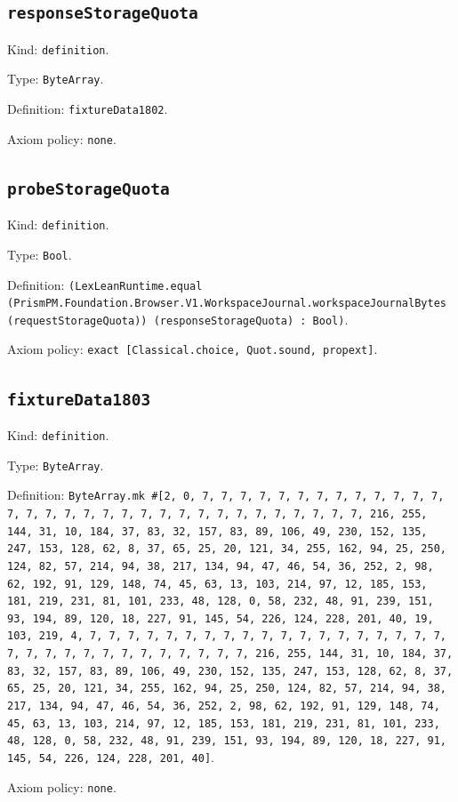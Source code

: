 \documentclass[11pt]{article}
\begin{document}
\subsection*{\texttt{responseStorageQuota}}
\noindent Kind: \texttt{definition}.\par
\noindent Type: \texttt{ByteArray}.\par
\noindent Definition: \texttt{fixtureData1802}.\par
\noindent Axiom policy: \texttt{none}.\par
\subsection*{\texttt{probeStorageQuota}}
\noindent Kind: \texttt{definition}.\par
\noindent Type: \texttt{Bool}.\par
\noindent Definition: \texttt{(LexLeanRuntime.equal (PrismPM.Foundation.Browser.V1.WorkspaceJournal.workspaceJournalBytes (requestStorageQuota)) (responseStorageQuota) : Bool)}.\par
\noindent Axiom policy: \texttt{exact [Classical.choice, Quot.sound, propext]}.\par
\subsection*{\texttt{fixtureData1803}}
\noindent Kind: \texttt{definition}.\par
\noindent Type: \texttt{ByteArray}.\par
\noindent Definition: \texttt{ByteArray.mk \#[2, 0, 7, 7, 7, 7, 7, 7, 7, 7, 7, 7, 7, 7, 7, 7, 7, 7, 7, 7, 7, 7, 7, 7, 7, 7, 7, 7, 7, 7, 7, 7, 7, 7, 216, 255, 144, 31, 10, 184, 37, 83, 32, 157, 83, 89, 106, 49, 230, 152, 135, 247, 153, 128, 62, 8, 37, 65, 25, 20, 121, 34, 255, 162, 94, 25, 250, 124, 82, 57, 214, 94, 38, 217, 134, 94, 47, 46, 54, 36, 252, 2, 98, 62, 192, 91, 129, 148, 74, 45, 63, 13, 103, 214, 97, 12, 185, 153, 181, 219, 231, 81, 101, 233, 48, 128, 0, 58, 232, 48, 91, 239, 151, 93, 194, 89, 120, 18, 227, 91, 145, 54, 226, 124, 228, 201, 40, 19, 103, 219, 4, 7, 7, 7, 7, 7, 7, 7, 7, 7, 7, 7, 7, 7, 7, 7, 7, 7, 7, 7, 7, 7, 7, 7, 7, 7, 7, 7, 7, 7, 7, 7, 7, 216, 255, 144, 31, 10, 184, 37, 83, 32, 157, 83, 89, 106, 49, 230, 152, 135, 247, 153, 128, 62, 8, 37, 65, 25, 20, 121, 34, 255, 162, 94, 25, 250, 124, 82, 57, 214, 94, 38, 217, 134, 94, 47, 46, 54, 36, 252, 2, 98, 62, 192, 91, 129, 148, 74, 45, 63, 13, 103, 214, 97, 12, 185, 153, 181, 219, 231, 81, 101, 233, 48, 128, 0, 58, 232, 48, 91, 239, 151, 93, 194, 89, 120, 18, 227, 91, 145, 54, 226, 124, 228, 201, 40]}.\par
\noindent Axiom policy: \texttt{none}.\par
\end{document}
